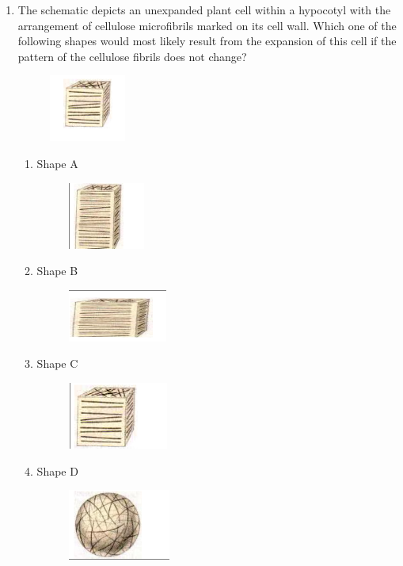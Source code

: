 \documentclass[journal,12pt,onecolumn]{IEEEtran}
\begin{document}
\begin{enumerate}
    \item The schematic depicts an unexpanded plant cell within a hypocotyl with the arrangement of cellulose microfibrils marked on its cell wall. Which one of the following shapes would most likely result from the expansion of this cell if the pattern of the cellulose fibrils does not change?\\
   \begin{figure}[H]
		\centering
            \includegraphics{50}
		    \caption*{}
		\label{fig:Q50}
	\end{figure} 
    \begin{enumerate}
        \item Shape A
   \begin{figure}[H]
		\centering
            \includegraphics{50a}
		    \caption*{}
		\label{fig:Q50a}
	\end{figure} 
        \item Shape B
   \begin{figure}[H]
		\centering
            \includegraphics{50b}
		    \caption*{}
		\label{fig:Q50b}
	\end{figure} 
        \item Shape C
   \begin{figure}[H]
		\centering
            \includegraphics{50c}
		    \caption*{}
		\label{fig:Q50c}
	\end{figure} 
        \item Shape D
   \begin{figure}[H]
		\centering
            \includegraphics{50d}
		    \caption*{}
		\label{fig:Q50d}
	\end{figure} 
    \end{enumerate}


\end{enumerate}
\end{document}
